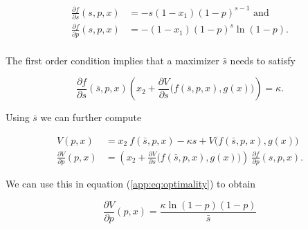 \documentclass[american, abstract=on]{scrartcl}
\begin{document}
\begin{equation}
  \begin{split}
    \frac{\partial f}{\partial s}(s, p, x) &= -s (1 - x_1) (1 - p)^{s-1} \text{ and } \\
    \frac{\partial f}{\partial p}(s, p, x) &= -(1 - x_1) (1 - p)^{s}  \ln(1 - p). \\
  \end{split}
\end{equation}

The first order condition implies that a maximizer $\bar{s}$ needs to satisfy

\begin{equation} \label{app:eq:optimality}
  \frac{\partial f}{\partial s}(\bar{s}, p, x) \left(x_2 + \frac{\partial V}{\partial s}\Big(f(\bar{s}, p, x), g(x)\Big) \right) = \kappa.
\end{equation}

Using $\bar{s}$ we can further compute

\begin{equation}
  \begin{split}
    V(p, x) &=  x_2 \ f(\bar{s}, p, x) - \kappa s + V\Big(f(\bar{s}, p, x), g(x)\Big) \\
    \frac{\partial V}{\partial p}(p, x) &= \left(x_2 + \frac{\partial V}{\partial s}\Big(f(\bar{s}, p, x), g(x)\Big) \right) \ \frac{\partial f}{\partial p}(s, p, x).
  \end{split}
\end{equation}

We can use this in equation (\ref{app:eq:optimality}) to obtain

\begin{equation}
  \frac{\partial V}{\partial p}(p, x) = \frac{\kappa \ln(1 - p) (1 - p)}{\bar{s}}
\end{equation}
\end{document}
